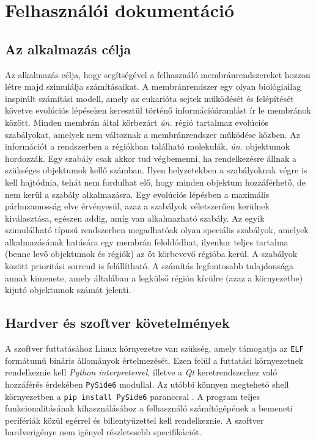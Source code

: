 \chapter{Felhasználói dokumentáció}
\label{ch:user}


\section{Az alkalmazás célja}

Az alkalmazás célja, hogy segítségével a felhasználó membránrendszereket hozzon létre majd szimulálja számításaikat. A membránrendszer egy olyan biológiailag inspirált számítási modell, amely az eukarióta sejtek működését és felépítését követve evolúciós lépéseken keresztül történő információáramlást ír le membránok között. Minden membrán által körbezárt \textit{ún.} régió tartalmaz evolúciós szabályokat, amelyek nem változnak a membránrendszer működése közben. Az információt a rendszerben a régiókban található molekulák, \textit{ún.} objektumok hordozzák. Egy szabály csak akkor tud végbemenni, ha rendelkezésre állnak a szükséges objektumok kellő számban. Ilyen helyzetekben a szabályoknak végre is kell hajtódnia, tehát nem fordulhat elő, hogy minden objektum hozzáférhető, de nem kerül a szabály alkalmazásra. Egy evolúciós lépésben a maximális párhuzamosság elve érvényesül, azaz a szabályok véletszerűen kerülnek kiválasztása, egészen addig, amíg van alkalmazható szabály. Az egyik szimulálható típusú rendszerben megadhatóak olyan speciális szabályok, amelyek alkalmazásának hatására egy membrán feloldódhat, ilyenkor teljes tartalma (benne levő objektumok és régiók) az őt körbevevő régióba kerül. A szabályok között prioritási sorrend is felállítható. A számítás legfontosabb tulajdonsága annak kimenete, amely általában a legkülső régión kívülre (azaz a környezetbe) kijutó objektumok számát jelenti.


\section{Hardver és szoftver követelmények}

A szoftver futtatásához Linux környezetre van szükség, amely támogatja az \verb|ELF| formátumú bináris állományok értelmezését. Ezen felül a futtatási környezetnek rendelkeznie kell \textit{Python interpreterrel}, illetve a \textit{Qt} keretrendszerhez való hozzáférés érdekében \verb|PySide6| modullal. Az utóbbi könnyen megtehető shell környezetben a \verb|pip install PySide6| paranccsal . A program teljes funkcionalitásának kihasználásához a felhasználó számítógépének a bemeneti perifériák közül egérrel és billentyűzettel kell rendelkeznie. A szoftver hardverigénye nem igényel részletesebb specifikációt.


